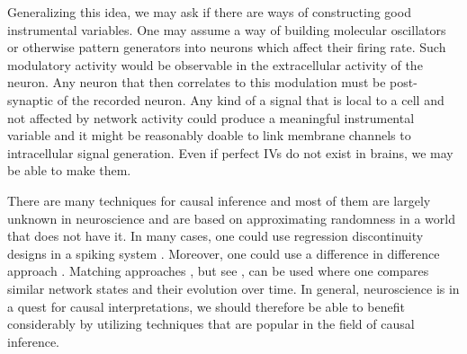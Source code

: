 \documentclass[11pt]{article}
\begin{document}
Generalizing this idea, we may ask if there are ways of constructing good instrumental variables. One may assume a way of building molecular oscillators or otherwise pattern generators into neurons which affect their firing rate. Such modulatory activity would be observable in the extracellular activity of the neuron. Any neuron that then correlates to this modulation must be post-synaptic of the recorded neuron. Any kind of a signal that is local to a cell and not affected by network activity could produce a meaningful instrumental variable and it might be reasonably doable to link membrane channels to intracellular signal generation. Even if perfect IVs do not exist in brains, we may be able to make them.

There are many techniques for causal inference and most of them are largely unknown in neuroscience and are based on approximating randomness in a world that does not have it. In many cases, one could use regression discontinuity designs in a spiking system \citep{BenPaper, imbens2008regression}. Moreover, one could use a difference in difference approach \citep{abadie2005semiparametric}. Matching approaches \citep{stuart2010matching}, but see \citep{king2016propensity}, can be used where one compares similar network states and their evolution over time. In general, neuroscience is in a quest for causal interpretations, we should therefore be able to benefit considerably by utilizing techniques that are popular in the field of causal inference.


\end{document}

